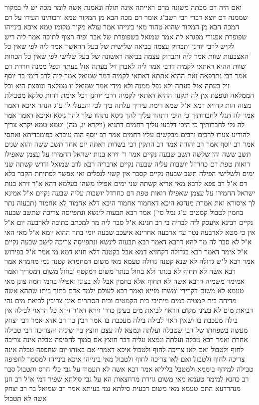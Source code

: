\documentclass[12pt, openany]{book}
\begin{document}
{ואם היה דם מכתה משונה מדם ראייתה אינה תולה  ונאמנת אשה לומר מכה יש לי במקור שממנה דם יוצא דברי רבי 
רשב"ג אומר  דם מכה הבא מן המקור טמא  ורבותינו העידו על דם המכה הבא מן המקור שהוא טהור 
מאי בינייהו  אמר עולא  מקור מקומו טמא איכא בינייהו 
שפופרת אפגורי מפגרא לה  אמר שמואל  בשפופרת של אבר ופיה רצוף לתוכה 
אמר ליה ריש לקיש לרבי יוחנן  ותבדוק עצמה בביאה שלישית של בעל הראשון  אמר ליה  לפי שאין כל האצבעות שוות 
אמר ליה  ותבדוק עצמה בביאה ראשונה של בעל שלישי  לפי שאין כל הכחות שוות 
ההיא דאתאי לקמיה דרבי אמר ליה לאבדן  זיל בעתה  אזל בעתה ונפל ממנה חררת דם  אמר רבי  נתרפאה זאת 
ההיא אתתא דאתאי לקמיה דמר שמואל אמר ליה לרב דימי בר יוסף  זיל בעתה  אזל בעתה ולא נפל ממנה ולא מידי  אמר שמואל  זו ממלאה ונופצת היא וכל הממלאה ונופצת אין לה תקנה 
ההיא דאתאי לקמיה דרבי יוחנן דכל אימת דהות סלקא מטבילת מצוה הות קחזיא דמא  א"ל  שמא דימת עיריך עלתה ביך לכי והבעלי לו ע"ג הנהר 
איכא דאמר אמר לה  תגלי לחברותיך  כי היכי דתהוו עליך להך גיסא נתהוו עלך להך גיסא  ואיכא דאמר אמר לה  גלי לחברותיך כי היכי דלבעו עליך רחמים  דתניא  (ויקרא יג, מה) וטמא טמא יקרא צריך להודיע צערו לרבים ורבים מבקשים עליו רחמים 
אמר רב יוסף  הוה עובדא בפומבדיתא ואתסי 
אמר רב יוסף אמר רב יהודה אמר רב התקין רבי בשדות  ראתה יום אחד תשב ששה והוא
שנים תשב ששה והן שלשה תשב שבעה נקיים 
אמר ר' זירא  בנות ישראל החמירו על עצמן שאפילו רואות טפת דם כחרדל יושבות עליה שבעה נקיים 
אדבריה רבא לרב שמואל ודרש  קשתה שני ימים ולשלישי הפילה תשב שבעה נקיים  קסבר  אין קשוי לנפלים ואי אפשר לפתיחת הקבר בלא דם 
א"ל רב פפא לרבא  מאי אריא קשתה שני ימים אפילו משהו בעלמא  דהא א"ר זירא  בנות ישראל החמירו על עצמן שאפילו רואות טפת דם כחרדל יושבות עליה שבעה נקיים 
א"ל  אמינא לך איסורא ואת אמרת מנהגא  היכא דאחמור אחמור היכא דלא אחמור לא אחמור 
(תבעוה נתר בחמין לטבול קמטים ע"ג נמל סי')  אמר רבא  תבעוה לינשא ונתפייסה צריכה שתשב שבעה נקיים 
רבינא איעסק ליה לבריה בי רב חנינא א"ל  סבר ליה מר למכתב כתובה לארבעה יום  א"ל  אין  כי מטא לארבעה נטר עד ארבעה אחרינא איעכב שבעה יומי בתר ההוא יומא 
א"ל  מאי האי  א"ל  לא סבר לה מר להא דרבא דאמר רבא  תבעוה לינשא ונתפייסה צריכה לישב שבעה נקיים  א"ל  אימר דאמר רבא בגדולה דקחזיא דמא אבל בקטנה דלא חזיא דמא מי אמר 
א"ל  בפירוש אמר רבא ל"ש גדולה לא שנא קטנה גדולה טעמא מאי  משום דמחמדא קטנה נמי מחמדא 
אמר רבא  אשה
לא תחוף לא בנתר ולא בחול  בנתר משום דמקטף ובחול משום דמסריך 
ואמר אמימר משמיה דרבא  אשה לא תחוף אלא בחמין אבל לא בצונן ואפילו בחמי חמה  צונן מאי טעמא לא משום דקרירי ומשרו מזייא 
ואמר רבא  לעולם ילמד אדם בתוך ביתו שתהא אשה מדיחה בית קמטיה במים  מיתיבי  בית הקמטים ובית הסתרים אינן צריכין לביאת מים 
נהי דביאת מים לא בעינן מקום הראוי לביאת מים בעינן כדר' זירא  דא"ר זירא  כל הראוי לבילה אין בילה מעכבת בו ושאין ראוי לבילה בילה מעכבת בו 
אמר רבין בר רב אדא אמר רבי יצחק  מעשה בשפחתו של רבי שטבלה ועלתה ונמצא לה עצם חוצץ בין שיניה והצריכה רבי טבילה אחרת 
ואמר רבא  טבלה ועלתה ונמצא עליה דבר חוצץ אם סמוך לחפיפה טבלה אינה צריכה לחוף ולטבול ואם לאו צריכה לחוף ולטבול 
איכא דאמרי  אם באותו יום שחפפה טבלה אינה צריכה לחוף ולטבול ואם לאו צריכה לחוף ולטבול 
מאי בינייהו  איכא בינייהו  למסמך לחפיפה טבילה למיחף ביממא ולמטבל בליליא 
אמר רבא  אשה לא תעמוד על גבי כלי חרס ותטבול  סבר רב כהנא למימר  טעמא מאי משום גזירת מרחצאות הא על גבי סילתא שפיר דמי 
א"ל רב חנן מנהרדעא  התם טעמא מאי משום דבעית סילתא נמי בעיתא 
אמר רב שמואל בר רב יצחק  אשה לא תטבול}
\end{document}
